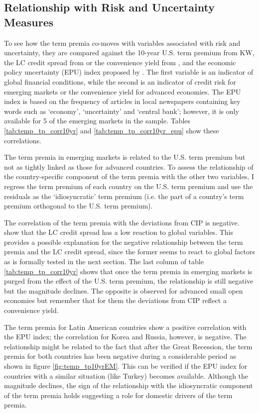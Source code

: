{\subsection{Relationship with Risk and Uncertainty Measures}
To see how the term premia co-moves with variables associated with risk and uncertainty, they are compared against the 10-year U.S. term premium from KW, the LC credit spread from \cite{DuSchreger:2016JoF} or the convenience yield from \cite{DuImSchreger:2018JIE}, and the economic policy uncertainty (EPU) index proposed by \citet*{BakerBloomDavis:2016}. The first variable is an indicator of global financial conditions, while the second is an indicator of credit risk for emerging markets or the convenience yield for advanced economies. The EPU index is based on the frequency of articles in local newspapers containing key words such as `economy', `uncertainty' and `central bank'; however, it is only available for 5 of the emerging markets in the sample. Tables \ref{tab:temp_tp_corr10yr} and \ref{tab:temp_tp_corr10yr_epu} show these correlations.
%	
	
	

The term premia in emerging markets is related to the U.S. term premium but not as tightly linked as those for advanced countries. To assess the relationship of the country-specific component of the term premia with the other two variables, I regress the term premium of each country on the U.S. term premium and use the residuals as the `idiosyncratic' term premium (i.e. the part of a country's term premium orthogonal to the U.S. term premium).

The correlation of the term premia with the deviations from CIP is negative. \cite{DuSchreger:2016JoF} show that the LC credit spread has a low reaction to global variables. This provides a possible explanation for the negative relationship between the term premia and the LC credit spread, since the former seems to react to global factors as is formally tested in the next section. The last column of table \ref{tab:temp_tp_corr10yr}  shows that once the term premia in emerging markets is purged from the effect of the U.S. term premium, the relationship is still negative but the magnitude declines. The opposite is observed for advanced small open economies but remember that for them the deviations from CIP reflect a convenience yield.

The term premia for Latin American countries show a positive correlation with the EPU index; the correlation for Korea and Russia, however, is negative. The relationship might be related to the fact that after the Great Recession, the term premia for both countries has been negative during a considerable period as shown in figure \ref{fig:temp_tp10yrEM}. This can be verified if the EPU index for countries with a similar situation (like Turkey) becomes available. Although the magnitude declines, the sign of the relationship with the idiosyncratic component of the term premia holds suggesting a role for domestic drivers of the term premia.

}
